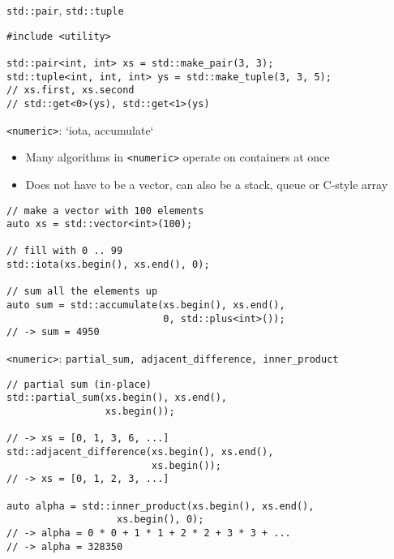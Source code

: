 \documentclass[10pt]{beamer}
\begin{document}
\begin{frame}[fragile,label={sec:org334fcc6}]{\texttt{std::pair}, \texttt{std::tuple}}
 \begin{verbatim}
#include <utility>

std::pair<int, int> xs = std::make_pair(3, 3);
std::tuple<int, int, int> ys = std::make_tuple(3, 3, 5);
// xs.first, xs.second
// std::get<0>(ys), std::get<1>(ys)
\end{verbatim}
\end{frame}

\begin{frame}[fragile,label={sec:orgbf3f088}]{\texttt{<numeric>}: `iota, accumulate`}
 \begin{itemize}
\item Many algorithms in \texttt{<numeric>} operate on containers at once
\item Does not have to be a vector, can also be a stack, queue or C-style array
\end{itemize}

\begin{verbatim}
// make a vector with 100 elements
auto xs = std::vector<int>(100);

// fill with 0 .. 99
std::iota(xs.begin(), xs.end(), 0);

// sum all the elements up
auto sum = std::accumulate(xs.begin(), xs.end(),
                           0, std::plus<int>());
// -> sum = 4950
\end{verbatim}
\end{frame}

\begin{frame}[fragile,label={sec:orgeaa9034}]{\texttt{<numeric>}: \texttt{partial\_sum, adjacent\_difference, inner\_product}}
 \begin{verbatim}
// partial sum (in-place)
std::partial_sum(xs.begin(), xs.end(),
                 xs.begin());

// -> xs = [0, 1, 3, 6, ...]
std::adjacent_difference(xs.begin(), xs.end(),
                         xs.begin());
// -> xs = [0, 1, 2, 3, ...]

auto alpha = std::inner_product(xs.begin(), xs.end(),
                   xs.begin(), 0);
// -> alpha = 0 * 0 + 1 * 1 + 2 * 2 + 3 * 3 + ...
// -> alpha = 328350
\end{verbatim}
\end{frame}
\end{document}
